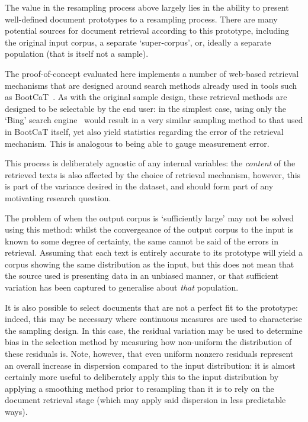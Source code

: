 The value in the resampling process above largely lies in the ability to present well-defined document prototypes to a resampling process.  There are many potential sources for document retrieval according to this prototype, including the original input corpus, a separate `super-corpus', or, ideally a separate population (that is itself not a sample).

The proof-of-concept evaluated here implements a number of web-based retrieval mechanisms that are designed around search methods already used in tools such as BootCaT~.  As with the original sample design, these retrieval methods are designed to be selectable by the end user: in the simplest case, using only the `Bing' search engine~ would result in a very similar sampling method to that used in BootCaT itself, yet also yield statistics regarding the error of the retrieval mechanism.  This is analogous to being able to gauge measurement error.

This process is deliberately agnostic of any internal variables: the \textsl{content} of the retrieved texts is also affected by the choice of retrieval mechanism, however, this is part of the variance desired in the dataset, and should form part of any motivating research question.

The problem of when the output corpus is `sufficiently large' may not be solved using this method: whilst the convergeance of the output corpus to the input is known to some degree of certainty, the same cannot be said of the errors in retrieval.  Assuming that each text is entirely accurate to its prototype will yield a corpus showing the same distribution as the input, but this does not mean that the source used is presenting data in an unbiased manner, or that sufficient variation has been captured to generalise about \textsl{that} population.

It is also possible to select documents that are not a perfect fit to the prototype: indeed, this may be necessary where continuous measures are used to characterise the sampling design.  In this case, the residual variation may be used to determine bias in the selection method by measuring how non-uniform the distribution of these residuals is.  Note, however, that even uniform nonzero residuals represent an overall increase in dispersion compared to the input distribution: it is almost certainly more useful to deliberately apply this to the input distribution by applying a smoothing method prior to resampling than it is to rely on the document retrieval stage (which may apply said dispersion in less predictable ways).

